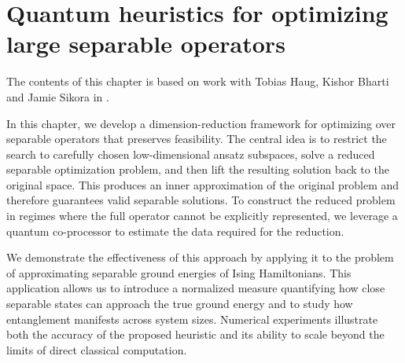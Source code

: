 \chapter{Quantum heuristics for optimizing large separable operators}\label{ch:Sep}

The contents of this chapter is based on work with Tobias Haug, Kishor Bharti and Jamie Sikora in \cite{mohan2025quantum}.

In this chapter, we develop a dimension-reduction framework for optimizing over separable operators that preserves feasibility.
The central idea is to restrict the search to carefully chosen low-dimensional ansatz subspaces, solve a reduced separable optimization problem, and then lift the resulting solution back to the original space. 
This produces an inner approximation of the original problem and therefore guarantees valid separable solutions. 
To construct the reduced problem in regimes where the full operator cannot be explicitly represented, we leverage a quantum co-processor to estimate the data required for the reduction.

We demonstrate the effectiveness of this approach by applying it to the problem of approximating separable ground energies of Ising Hamiltonians. 
This application allows us to introduce a normalized measure quantifying how close separable states can approach the true ground energy and to study how entanglement manifests across system sizes. 
Numerical experiments illustrate both the accuracy of the proposed heuristic and its ability to scale beyond the limits of direct classical computation.

